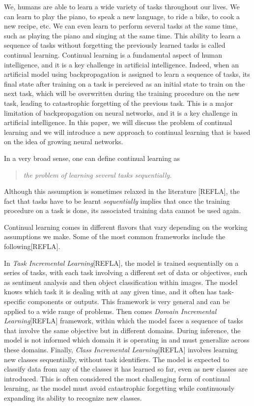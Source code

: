 \documentclass[twocolumn]{article}
\begin{document}
We, humans are able to learn a wide variety of tasks throughout our lives. We can learn to play the piano, to speak a new language, to ride a bike, to cook a new recipe, etc. We can even learn to perform several tasks at the same time, such as playing the piano and singing at the same time. This ability to learn a sequence of tasks without forgetting the previously learned tasks is called continual learning. Continual learning is a fundamental aspect of human intelligence, and it is a key challenge in artificial intelligence. Indeed, when an artificial model using backpropagation is assigned to learn a sequence of tasks, its final state after training on a task is percieved as an initial state to train on the next task, which will be overwritten during the training procedure on the new task, leading to catastrophic forgetting of the previous task. This is a major limitation of backpropagation on neural networks, and it is a key challenge in artificial intelligence. In this paper, we will discuss the problem of continual learning and we will introduce a new approach to continual learning that is based on the idea of growing neural networks.

\vspace{2mm}
\noindent
In a very broad sense, one can define continual learning as

\begin{quote}
    \itshape
    \centering
    the problem of learning several tasks sequentially.
\end{quote}
Although this assumption is sometimes relaxed in the literature [REFLA], the fact that tasks have to be learnt \textit{sequentially} implies that once the training procedure on a task is done, its associated training data cannot be used again. 

\vspace{2mm}
\noindent
Continual learning comes in different flavors that vary depending on the working assumptions we make. Some of the most common frameworks include the following[REFLA].

\vspace{2mm}
\noindent
In \textit{Task Incremental Learning}[REFLA], the model is trained sequentially on a series of tasks, with each task involving a different set of data or objectives, such as sentiment analysis and then object classification within images. The model knows which task it is dealing with at any given time, and it often has task-specific components or outputs. This framework is very general and can be applied to a wide range of problems. Then comes \textit{Domain Incremental Learning}[REFLA] framework, within which the model faces a sequence of tasks that involve the same objective but in different domains. During inference, the model is not informed which domain it is operating in and must generalize across these domains. Finally, \textit{Class Incremental Learning}[REFLA] involves learning new classes sequentially, without task identifiers. The model is expected to classify data from any of the classes it has learned so far, even as new classes are introduced. This is often considered the most challenging form of continual learning, as the model must avoid catastrophic forgetting while continuously expanding its ability to recognize new classes.
\end{document}

